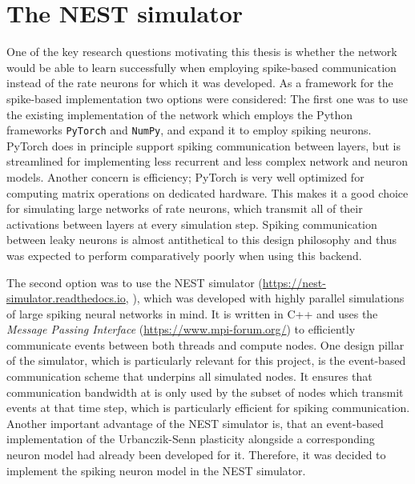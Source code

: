 \section{The NEST simulator}

One of the key research questions motivating this thesis is whether the network would be able to learn successfully when
employing spike-based communication instead of the rate neurons for which it was developed. As a framework for the
spike-based implementation two options were considered: The first one was to use the existing implementation of the
network which employs the Python frameworks \texttt{PyTorch} and \texttt{NumPy}, and expand it to employ spiking
neurons. PyTorch does in principle support spiking communication between layers, but is streamlined for implementing
less recurrent and less complex network and neuron models. Another concern is efficiency; PyTorch is very well optimized
for computing matrix operations on dedicated hardware. This makes it a good choice for simulating large networks of rate
neurons, which transmit all of their activations between layers at every simulation step. Spiking communication between
leaky neurons is almost antithetical to this design philosophy and thus was expected to perform comparatively poorly
when using this backend.

The second option was to use the NEST simulator (\url{https://nest-simulator.readthedocs.io}, \cite{Gewaltig2007}), which was developed
with highly parallel simulations of large spiking neural networks in mind. It is written in C++ and uses the
\textit{Message Passing Interface} (\url{https://www.mpi-forum.org/}) to efficiently communicate events between
both threads and compute nodes. One design pillar of the simulator, which is particularly relevant for this project, is
the event-based communication scheme that underpins all simulated nodes. It ensures that communication bandwidth at is
only used by the subset of nodes which transmit events at that time step, which is particularly efficient for spiking
communication. Another important advantage of the NEST simulator is, that an event-based implementation of the
Urbanczik-Senn plasticity alongside a corresponding neuron model had already been developed for it. Therefore, it was
decided to implement the spiking neuron model in the NEST simulator.

